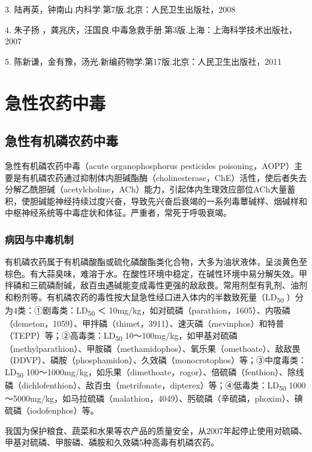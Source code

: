 3. 陆再英，钟南山.内科学.第7版.北京：人民卫生出版社，2008

4. 朱子扬
，龚兆庆，汪国良.中毒急救手册.第3版.上海：上海科学技术出版社，2007

5. 陈新谦，金有豫，汤光.新编药物学.第17版.北京：人民卫生出版社，2011

\protect\hypertarget{text00139.html}{}{}

\chapter{急性农药中毒}

\section{急性有机磷农药中毒}

急性有机磷农药中毒（acute organophosphorus pesticides
poisoning，AOPP）主要是有机磷农药通过抑制体内胆碱酯酶（cholinesterase，ChE）活性，使后者失去分解乙酰胆碱（acetylcholine，ACh）能力，引起体内生理效应部位ACh大量蓄积，使胆碱能神经持续过度兴奋，导致先兴奋后衰竭的一系列毒蕈碱样、烟碱样和中枢神经系统等中毒症状和体征。严重者，常死于呼吸衰竭。

\subsection{病因与中毒机制}

有机磷农药属于有机磷酸酯或硫化磷酸酯类化合物，大多为油状液体，呈淡黄色至棕色。有大蒜臭味，难溶于水。在酸性环境中稳定，在碱性环境中易分解失效。甲拌磷和三硫磷耐碱，敌百虫遇碱能变成毒性更强的敌敌畏。常用剂型有乳剂、油剂和粉剂等。有机磷农药的毒性按大鼠急性经口进入体内的半数致死量（LD\textsubscript{50}
）分为4类：①剧毒类：LD\textsubscript{50} ＜
10mg/kg，如对硫磷（parathion，1605）、内吸磷（demeton，1059）、甲拌磷（thimet，3911）、速灭磷（mevinphos）和特普（TEPP）等；②高毒类：LD\textsubscript{50}
10～100mg/kg，如甲基对硫磷（methylparathion）、甲胺磷（methamidophos）、氧乐果（omethoate）、敌敌畏（DDVP）、磷胺（phosphamidon）、久效磷（monocrotophos）等；③中度毒类：LD\textsubscript{50}
100～1000mg/kg，如乐果（dimethoate，rogor）、倍硫磷（fenthion）、除线磷（dichlofenthion）、敌百虫（metrifonate，dipterex）等；④低毒类：LD\textsubscript{50}
1000～5000mg/kg，如马拉硫磷（malathion，4049）、肟硫磷（辛硫磷，phoxim）、碘硫磷（iodofenphos）等。

我国为保护粮食、蔬菜和水果等农产品的质量安全，从2007年起停止使用对硫磷、甲基对硫磷、甲胺磷、磷胺和久效磷5种高毒有机磷农药。

